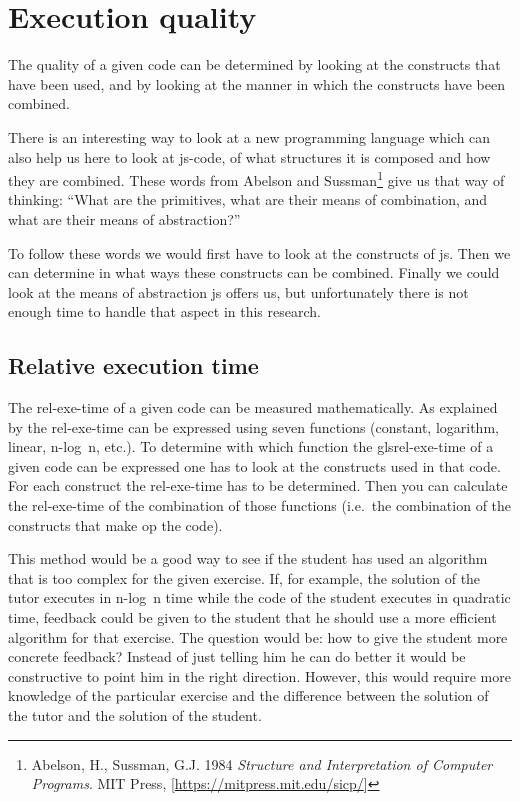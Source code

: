 \section{Execution quality}

The quality of a given \gls{code} can be determined by looking at
the \glspl{construct} that have been used,
and by looking at the manner in which the \glspl{construct} have been combined.

There is an interesting way to look at a new programming language
which can also help us here to look at \gls{js-code},
of what structures it is composed and how they are combined.
These words from Abelson and
Sussman\footnote{Abelson, H., Sussman, G.J. 1984
  {\em Structure and Interpretation of Computer Programs}.
  MIT Press, [\url{https://mitpress.mit.edu/sicp/}]}
give us that way of thinking:
``What are the primitives, what are their means of combination,
and what are their means of abstraction?''

To follow these words we would first have to look at
the \glspl{construct} of \gls{js}.
Then we can determine in what ways these \glspl{construct} can be combined.
Finally we could look at the means of abstraction \gls{js} offers us,
but unfortunately there is not enough time
to handle that aspect in this research.

\subsection{Relative execution time}

The \gls{rel-exe-time} of a given \gls{code} can be measured mathematically.
As explained by \citet[Chapter 4]{goodrich2008data}
the \gls{rel-exe-time} can be expressed using seven functions
(constant, logarithm, linear, n-log~n, etc.).
To determine with which function
the gls{rel-exe-time} of a given \gls{code} can be expressed
one has to look at the \glspl{construct} used in that \gls{code}.
For each \gls{construct} the \gls{rel-exe-time} has to be determined.
Then you can calculate the \gls{rel-exe-time}
of the combination of those functions
(i.e.\ the combination of the \glspl{construct} that make op the \gls{code}).

This method would be a good way to see
if the \gls{student} has used an algorithm
that is too complex for the given \gls{exercise}.
If, for example, the \gls{solution} of the \gls{tutor} executes in n-log~n time
while the \gls{code} of the \gls{student} executes in quadratic time,
\gls{feedback} could be given to the \gls{student}
that he should use a more efficient algorithm for that \gls{exercise}.
The question would be:
how to give the \gls{student} more concrete \gls{feedback}?
Instead of just telling him he can do better
it would be constructive to point him in the right direction.
However, this would require more knowledge of the particular \gls{exercise}
and the difference between the \gls{solution} of the \gls{tutor}
and the \gls{solution} of the \gls{student}.


